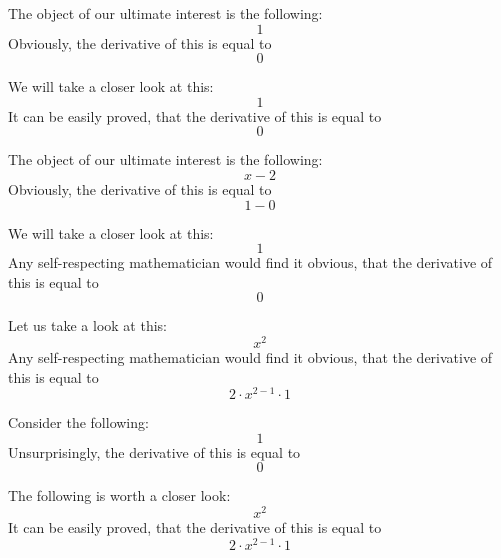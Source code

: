 \documentclass{article}
\begin{document}
The object of our ultimate interest is the following:
\begin{equation}
1 
\end{equation}
Obviously, the derivative of this is equal to
\begin{equation}
0 
\end{equation}

We will take a closer look at this:
\begin{equation}
1 
\end{equation}
It can be easily proved, that the derivative of this is equal to
\begin{equation}
0 
\end{equation}

The object of our ultimate interest is the following:
\begin{equation}
x - 2 
\end{equation}
Obviously, the derivative of this is equal to
\begin{equation}
1 - 0 
\end{equation}

We will take a closer look at this:
\begin{equation}
1 
\end{equation}
Any self-respecting mathematician would find it obvious, that the derivative of this is equal to
\begin{equation}
0 
\end{equation}

Let us take a look at this:
\begin{equation}
x ^{2 } 
\end{equation}
Any self-respecting mathematician would find it obvious, that the derivative of this is equal to
\begin{equation}
2 \cdot x ^{2 - 1 } \cdot 1 
\end{equation}

Consider the following:
\begin{equation}
1 
\end{equation}
Unsurprisingly, the derivative of this is equal to
\begin{equation}
0 
\end{equation}

The following is worth a closer look:
\begin{equation}
x ^{2 } 
\end{equation}
It can be easily proved, that the derivative of this is equal to
\begin{equation}
2 \cdot x ^{2 - 1 } \cdot 1 
\end{equation}
\end{document}
